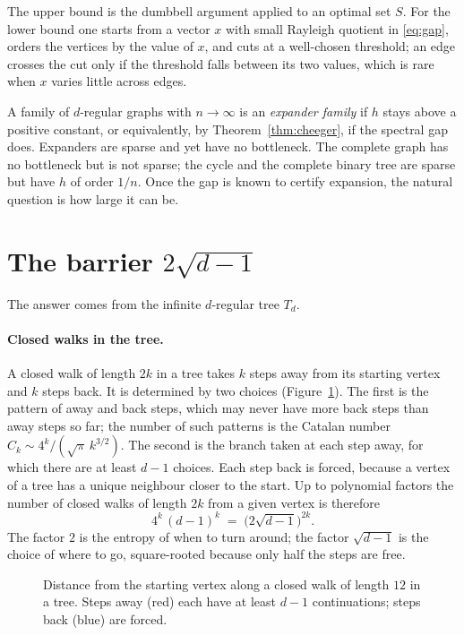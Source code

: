 \documentclass[11pt,letterpaper]{article}
\theoremstyle{definition}
\theoremstyle{remark}
\newcommand{\edge}{2\sqrt{d-1}}
\begin{document}
The upper bound is the dumbbell argument applied to an optimal set $S$. For the lower bound one
starts from a vector $x$ with small Rayleigh quotient in \eqref{eq:gap}, orders the vertices by
the value of $x$, and cuts at a well-chosen threshold; an edge crosses the cut only if the
threshold falls between its two values, which is rare when $x$ varies little across edges.

A family of $d$-regular graphs with $n\to\infty$ is an \emph{expander family} if $h$ stays above
a positive constant, or equivalently, by Theorem~\ref{thm:cheeger}, if the spectral gap does.
Expanders are sparse and yet have no bottleneck. The complete graph has no bottleneck but is not
sparse; the cycle and the complete binary tree are sparse but have $h$ of order $1/n$. Once the
gap is known to certify expansion, the natural question is how large it can be.

\section{The barrier \texorpdfstring{$\edge$}{2 sqrt(d-1)}}

The answer comes from the infinite $d$-regular tree $T_d$.

\paragraph{Closed walks in the tree.}
A closed walk of length $2k$ in a tree takes $k$ steps away from its starting vertex and $k$
steps back. It is determined by two choices (Figure~\ref{fig:dyck}). The first is the pattern of
away and back steps, which may never have more back steps than away steps so far; the number of
such patterns is the Catalan number $C_k\sim 4^k/(\sqrt{\pi}\,k^{3/2})$. The second is the branch
taken at each step away, for which there are at least $d-1$ choices. Each step back is forced,
because a vertex of a tree has a unique neighbour closer to the start. Up to polynomial factors
the number of closed walks of length $2k$ from a given vertex is therefore
\[
  4^k\,(d-1)^k\;=\;\bigl(\edge\bigr)^{2k}.
\]
The factor $2$ is the entropy of when to turn around; the factor $\sqrt{d-1}$ is the choice of
where to go, square-rooted because only half the steps are free.

\begin{figure}[ht]
  \centering
  
  \caption{Distance from the starting vertex along a closed walk of length $12$ in a tree. Steps
  away (red) each have at least $d-1$ continuations; steps back (blue) are forced.}
  \label{fig:dyck}
\end{figure}
\end{document}
